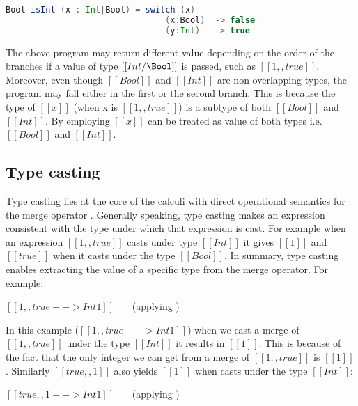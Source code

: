 \begin{lstlisting}[language=Scala]
  Bool isInt (x : Int|Bool) = switch (x)
                                (x:Bool)  -> false
                                (y:Int)   -> true
\end{lstlisting}

\noindent The above program
may return different value depending on the order of the branches
if a value of type $[[Int/\Bool]]$ is passed,
such as $[[1,,true]]$.
Moreover, even though $[[Bool]]$ and $[[Int]]$ are 
non-overlapping types, the program may fall either in the first or the 
second branch. This is because the type of $[[x]]$
(when x is $[[1,,true]]$)
is a subtype of both $[[Bool]]$ and $[[Int]]$.
By employing  $[[x]]$ can be treated as value of both types
i.e. $[[Bool]]$ and $[[Int]]$.



\subsection{Type casting}

Type casting lies at the core of the calculi with
direct operational semantics 
for the merge operator \citep{Huang:typedirected}. 
Generally speaking, type casting makes an expression 
consistent with the type under which that expression is cast.
For example when
an expression $[[1,,true]]$ casts under type $[[Int]]$ it gives 
$[[1]]$ and $[[true]]$ when it casts under the type $[[Bool]]$. 
In summary, type casting enables extracting
the value of a specific type from the merge operator.
For example:

\begin{center}
$[[1,,true --> Int 1]]$ \ \ \ (applying )
\end{center}

\noindent In this example
($[[1,,true --> Int 1]]$) when we cast a merge of $[[1,,true]]$
under the type $[[Int]]$ it results in $[[1]]$. This is because
of the fact that the only integer we can get from a merge of 
$[[1,,true]]$ is $[[1]]$. Similarly $[[true,,1]]$ also yields 
$[[1]]$ when casts under the type $[[Int]]$:

\begin{center}
$[[true,,1 --> Int 1]]$ \ \ \ (applying )
\end{center}


